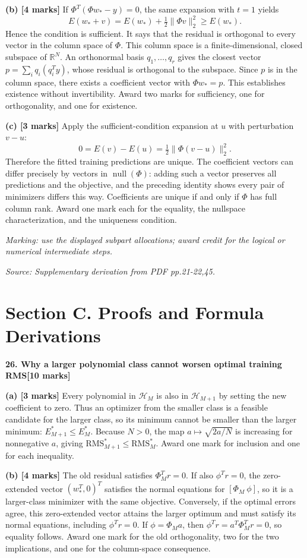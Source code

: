 \documentclass[11pt,a4paper]{article}
\begin{document}
\textbf{(b) [4 marks]} If \(\Phi^T(\Phi w_*-y)=0\), the same expansion with \(t=1\) yields \[E(w_*+v)=E(w_*)+\tfrac12\|\Phi v\|_2^2\geq E(w_*).\] Hence the condition is sufficient. It says that the residual is orthogonal to every vector in the column space of \(\Phi\). This column space is a finite-dimensional, closed subspace of \(\mathbb R^N\). An orthonormal basis \(q_1,\ldots,q_r\) gives the closest vector \(p=\sum_i q_i(q_i^Ty)\), whose residual is orthogonal to the subspace. Since \(p\) is in the column space, there exists a coefficient vector with \(\Phi w_*=p\). This establishes existence without invertibility. Award two marks for sufficiency, one for orthogonality, and one for existence.

\textbf{(c) [3 marks]} Apply the sufficient-condition expansion at \(u\) with perturbation \(v-u\): \[0=E(v)-E(u)=\tfrac12\|\Phi(v-u)\|_2^2.\] Therefore the fitted training predictions are unique. The coefficient vectors can differ precisely by vectors in \(\operatorname{null}(\Phi)\): adding such a vector preserves all predictions and the objective, and the preceding identity shows every pair of minimizers differs this way. Coefficients are unique if and only if \(\Phi\) has full column rank. Award one mark each for the equality, the nullspace characterization, and the uniqueness condition.

\textit{Marking: use the displayed subpart allocations; award credit for the logical or numerical intermediate steps.}\par
{\footnotesize\textit{Source: Supplementary derivation from PDF pp.21-22,45.}}
\newpage\section*{Section C. Proofs and Formula Derivations}
\textbf{26. Why a larger polynomial class cannot worsen optimal training RMS}\hfill\textbf{[10 marks]}\par\medskip
\textbf{(a) [3 marks]} Every polynomial in \(\mathcal H_M\) is also in \(\mathcal H_{M+1}\) by setting the new coefficient to zero. Thus an optimizer from the smaller class is a feasible candidate for the larger class, so its minimum cannot be smaller than the larger minimum: \(E_{M+1}^*\leq E_M^*\). Because \(N>0\), the map \(a\mapsto\sqrt{2a/N}\) is increasing for nonnegative \(a\), giving \(\mathrm{RMS}_{M+1}^*\leq\mathrm{RMS}_M^*\). Award one mark for inclusion and one for each inequality.

\textbf{(b) [4 marks]} The old residual satisfies \(\Phi_M^Tr=0\). If also \(\phi^Tr=0\), the zero-extended vector \((w_*^T,0)^T\) satisfies the normal equations for \([\Phi_M\ \phi]\), so it is a larger-class minimizer with the same objective. Conversely, if the optimal errors agree, this zero-extended vector attains the larger optimum and must satisfy its normal equations, including \(\phi^Tr=0\). If \(\phi=\Phi_Ma\), then \(\phi^Tr=a^T\Phi_M^Tr=0\), so equality follows. Award one mark for the old orthogonality, two for the two implications, and one for the column-space consequence.
\end{document}
